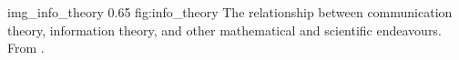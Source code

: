 \begin{myfig}
    {img_info_theory} %
    {0.65} %
    {fig:info_theory} %
    {The relationship between communication theory, information theory, and other mathematical and scientific endeavours.
    From \citet[p. 2, fig. 1.1]{cover2006elements}.
    } %
\end{myfig}